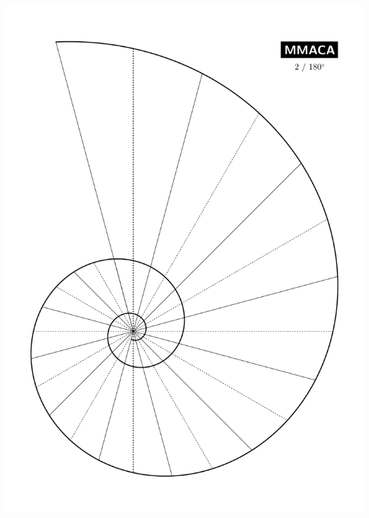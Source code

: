 \documentclass[a4paper,12pt]{article}
\begin{document}
\begin{center}
        \includegraphics[scale=0.3535]{./pictures/Spiral_2_180}

\end{center}
\end{document}
